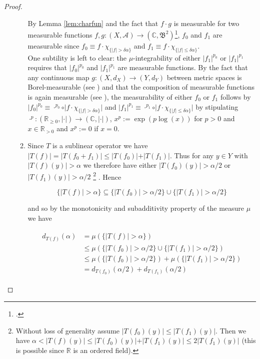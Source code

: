 \begin{proof}
\begin{enumerate}[label = \textbf{(\roman*.)}]
\begin{enumerate}[label = \textbf{\alph*.}]
	By Lemma \ref{lem:charfun} and the fact that $f \cdot g$ is measurable for two measurable functions $f,g: (X,\mathcal{A}) \rightarrow (\mathbb{C},\mathfrak{B}^2)$\footcite[107]{elstrodt:mass:2011}, $f_0$ and $f_1$ are measurable since $f_0 \equiv f \cdot \chi_{\{\vert f \vert > \delta \alpha\}}$ and $f_1 \equiv f \cdot \chi_{\{\vert f \vert \leqslant \delta \alpha\}}$.\\

	One subtility is left to clear: the $\mu$-integrability of either $\vert f_1\vert^{p_0}$ or $\vert f_1 \vert^{p_1}$ requires that $\vert f_0 \vert^{p_0}$ and $\vert f_1 \vert^{p_1}$ are measurable functions. By the fact that any continuous map $g: (X,d_X) \rightarrow (Y,d_Y)$ between metric spaces is Borel-measurable (see \cite[86]{elstrodt:mass:2011}) and that the composition of measurable functions is again measurable (see \cite[87]{elstrodt:mass:2011}), the measurability of either $f_0$ or $f_1$ follows by $\vert f_0 \vert^{p_0} \equiv \cdot^{p_0} \circ \vert f \cdot \chi_{\{\vert f\vert > \delta\alpha\}}\vert$ and $\vert f_1 \vert^{p_1} \equiv \cdot^{p_1} \circ \vert f \cdot \chi_{\{\vert f \vert \leqslant \delta \alpha\}}\vert$ by stipulating $\cdot^{p}: (\mathbb{R}_{\geqslant 0},\vert \cdot \vert) \rightarrow (\mathbb{C},\vert \cdot \vert)$, $x^{p} := \exp(p \log(x))$ for $p > 0$ and $x \in \mathbb{R}_{> 0}$ and $x^p := 0$ if $x = 0$.

	\item Since $T$ is a sublinear operator we have $\vert T(f) \vert = \vert T(f_0 + f_1) \vert \leqslant \vert T(f_0) \vert + \vert T(f_1)\vert$. Thus for any $y \in Y$ with $\vert T(f)(y) \vert > \alpha$ we therefore have either $\vert T(f_0)(y) \vert > \alpha/2$ or $\vert T(f_1)(y) \vert > \alpha/2$ 
		\footnote{Without loss of generality assume $\vert T(f_0)(y) \vert \leqslant \vert T(f_1)(y) \vert $. Then we have $\alpha < \vert T(f)(y)\vert \leqslant \vert T(f_0)(y) \vert + \vert T(f_1)(y)\vert \leqslant 2\vert T(f_1)(y)\vert$ (this is possible since $\mathbb{R}$ is an ordered field).}
		. Hence

\begin{equation*}
	\{\vert T(f)\vert > \alpha \} \subseteq \{\vert T(f_0) \vert > \alpha/2 \} \cup \{\vert T(f_1) \vert > \alpha/2 \}
\end{equation*}

and so by the monotonicity and subadditivity property of the measure $\mu$ we have

\begin{gather}
	\begin{aligned}
	d_{T(f)}(\alpha) &= \mu(\{\vert T(f)\vert > \alpha\})\\
	&\leqslant \mu(\{\vert T(f_0)\vert > \alpha/2 \} \cup \{\vert T(f_1)\vert > \alpha/2 \})\\
	&\leqslant \mu(\{\vert T(f_0) \vert > \alpha/2 \}) + \mu(\{\vert T(f_1)\vert > \alpha/2 \})\\
	&= d_{T(f_0)}(\alpha/2) + d_{T(f_1)}(\alpha/2)
	\label{est:T}
	\end{aligned}
\end{gather}


\end{enumerate}
\end{enumerate}
\end{proof}

